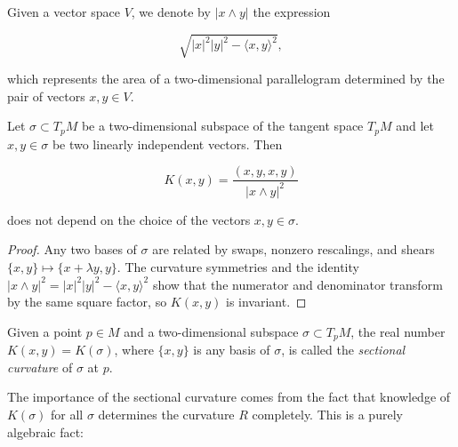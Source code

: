 Given a vector space $V$, we denote by $|x\wedge y|$ the expression

$$
\sqrt{|x|^2|y|^2-\langle x,y\rangle^2},
$$

which represents the area of a two-dimensional parallelogram determined by the
pair of vectors $x,y\in V$.

\begin{proposition}
  \label{prop:dc-ch4-3-1}
  \leanok
  Let $\sigma\subset T_pM$ be a two-dimensional subspace of the tangent space
  $T_pM$ and let $x,y\in\sigma$ be two linearly independent vectors. Then
  
  $$
  K(x,y)=\frac{(x,y,x,y)}{|x\wedge y|^2}
  $$
  
  does not depend on the choice of the vectors $x,y\in\sigma$.
\end{proposition}
\begin{proof}
  \leanok
  \sketch
  Any two bases of $\sigma$ are related by swaps, nonzero rescalings, and shears
  $\{x,y\}\mapsto\{x+\lambda y,y\}$. The curvature symmetries and the identity
  $|x\wedge y|^2=|x|^2|y|^2-\langle x,y\rangle^2$ show that the numerator and
  denominator transform by the same square factor, so $K(x,y)$ is invariant.
\end{proof}

\begin{definition}
  \label{def:dc-ch4-3-2}
  \leanok
  Given a point $p\in M$ and a two-dimensional subspace $\sigma\subset T_pM$, the
  real number $K(x,y)=K(\sigma)$, where $\{x,y\}$ is any basis of $\sigma$, is
  called the \emph{sectional curvature} of $\sigma$ at $p$.
  
  The importance of the sectional curvature comes from the fact that knowledge of
  $K(\sigma)$ for all $\sigma$ determines the curvature $R$ completely. This is a
  purely algebraic fact:
\end{definition}

